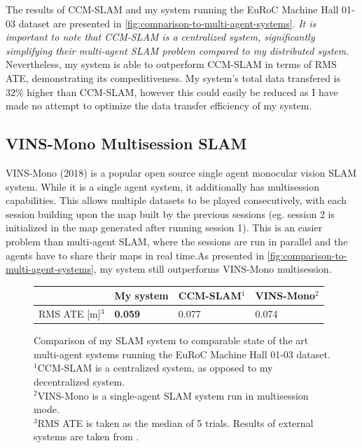 The results of CCM-SLAM and my system running the EuRoC Machine Hall 01-03 dataset are presented in \autoref{fig:comparison-to-multi-agent-systems}. \textit{It is important to note that CCM-SLAM is a centralized system, significantly simplifying their multi-agent SLAM problem compared to my distributed system.} Nevertheless, my system is able to outperform CCM-SLAM in terms of RMS ATE, demonstrating its compeditiveness. My system's total data transfered is 32\% higher than CCM-SLAM, however this could easily be reduced as I have made no attempt to optimize the data transfer efficiency of my system.

\subsection{VINS-Mono Multisession SLAM}
VINS-Mono (2018) \autocite{8421746} is a popular open source single agent monocular vision SLAM system. While it is a single agent system, it additionally has multisession capabilities. This allows multiple datasets to be played consecutively, with each session building upon the map built by the previous sessions (eg. session 2 is initialized in the map generated after running session 1). This is an easier problem than multi-agent SLAM, where the sessions are run in parallel and the agents have to share their maps in real time.As presented in \autoref{fig:comparison-to-multi-agent-systems}, my system still outperforms VINS-Mono multisession.

\begin{figure}[h]
    \centering
    \def\arraystretch{1.2}
    \begin{tabular}{ |l|l|l|l| }
        \cline{2-4}
        \multicolumn{1}{c|}{} & My system      & CCM-SLAM$^1$ & VINS-Mono$^2$ \\
        \hline
        RMS ATE [m]$^3$       & \textbf{0.059} & 0.077        & 0.074         \\
        \hline
    \end{tabular}

    \caption{Comparison of my SLAM system to comparable state of the art multi-agent systems running the EuRoC Machine Hall 01-03 dataset. \captionbreak $^1$CCM-SLAM is a centralized system, as opposed to my decentralized system. \\ $^2$VINS-Mono is a single-agent SLAM system run in multisession mode. \\ $^3$RMS ATE is taken as the median of 5 trials. Results of external systems are taken from \autocite{schmuck2019ccm}.}
    \label{fig:comparison-to-multi-agent-systems}
\end{figure}

